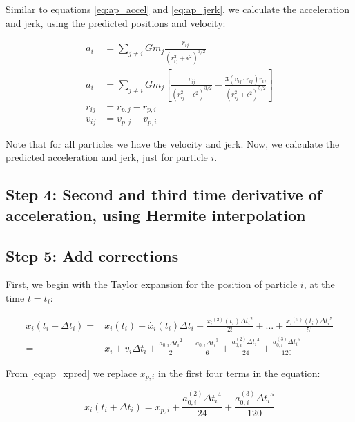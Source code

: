 \begin{appendixs}
	Similar to equations \ref{eq:ap_accel} and \ref{eq:ap_jerk}, we calculate the acceleration and jerk, using the predicted positions and velocity:
	
	\begin{align}
		a_i &= \sum_{j \neq i} G m_j \frac{r_{ij}}{(r_{ij}^2 + \epsilon^2)^{3/2}} \label{eq:ap_accel_pred} \\
		\dot{a}_i &= \sum_{j \neq i} G m_j \left[\frac{v_{ij}}{(r_{ij}^2 + \epsilon^2)^{3/2}} - \frac{3(v_{ij} \cdot r_{ij})r_{ij}}{(r_{ij}^2 + \epsilon^2)^{5/2}}\right] \label{eq:ap_jerk_pred} \\
		r_{ij} &= r_{p,j} - r_{p,i} \\
		v_{ij} &= v_{p,j} - v_{p,i}
	\end{align}
	
	Note that for all particles we have the velocity and jerk. Now, we calculate the predicted acceleration and jerk, just for particle $i$.
	
	\subsection{Step 4: Second and third time derivative of acceleration, using Hermite interpolation}
	
	\subsection{Step 5: Add corrections}
	
	First, we begin with the Taylor expansion for the position of particle $i$, at the time $t = t_i$:
	
	\begin{align}
		x_i(t_i + \Delta t_i) =& x_i(t_i) + \dot{x_i}(t_i)\Delta t_i + \frac{{x_i}^{(2)}(t_i){\Delta t_i}^2}{2!} + ... + \frac{{x_i}^{(5)}(t_i){\Delta t_i}^5}{5!}\\
		=& x_i + v_i \Delta t_i + \frac{a_{0, i} {\Delta t_i}^2}{2} + \frac{\dot{a}_{0, i} {\Delta t_i}^3}{6} + \frac{a^{(2)}_{0, i} {\Delta t_i}^4}{24} + \frac{a^{(3)}_{0, i} {\Delta t_i}^5}{120}
	\end{align}
	
	From \eqref{eq:ap_xpred} we replace $x_{p, i}$ in the first four terms in the equation:
	
	\begin{equation}
		x_i(t_i + \Delta t_i) = x_{p, i} + \frac{a^{(2)}_{0, i} {\Delta t_i}^4}{24} + \frac{a^{(3)}_{0, i} {\Delta t_i}^5}{120} \label{eq:ap_xcorr}
	\end{equation}
	

\end{appendixs}
